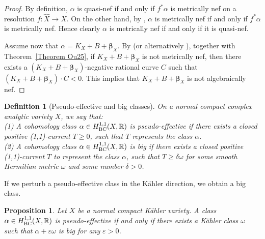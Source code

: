 \documentclass[12pt]{amsart}
\numberwithin{equation}{section}
\newtheorem{proposition}[theorem]{Proposition}
\theoremstyle{definition}
\theoremstyle{plain}
\newtheorem{definition}  [theorem]     {Definition}
\newtheorem*{thm A*}{Theorem A}
\newtheorem*{thm B*}{Theorem B}
\newtheorem*{thm C*}{Theorem C}
\newtheorem*{thm D*}{Theorem D}
\theoremstyle{definition}
\renewcommand{\1}{\mathds{1}}
\newcommand{\bbeta}{\boldsymbol{\beta}}
\renewcommand{\>}{\rightarrow}
\begin{document}
\begin{proof}
By definition, $\alpha$ is quasi-nef if and only if $f^* \alpha$ is metrically nef on a resolution $f: \widehat{X} \to X$. On the other hand, by \cite[Theorem 1]{Paunnef},  $\alpha$ is metrically nef if and only if $f^* \alpha$ is metrically nef. Hence clearly $\alpha$ is metrically nef if and only if it is quasi-nef. 

Assume now that $\alpha = K_X + B + \bbeta_X$. By \cite[Theorem 0.5]{HP24} (or alternatively \cite[Theorem 1.3]{CH20}), together with Theorem~\ref{Theorem Ou25}, if $K_X + B + \bbeta_X$ is not metrically nef, then there exists a $(K_X + B + \bbeta_X)$-negative rational curve $C$ such that $
(K_X + B + \bbeta_X)\cdot C < 0$. 
This implies that $K_X + B + \bbeta_X$ is not algebraically nef. 
\end{proof}

\begin{definition}[Pseudo-effective and big classes]
On a normal compact complex analytic variety $X$, we say that:\\  
\emph{(1)} A cohomology class $\alpha \in H^{1,1}_{\rm{BC}}(X,\mathbb{R})$ is \emph{pseudo-effective} if there exists a closed positive (1,1)-current $T\ge 0$, such that $T$ represents the class $\alpha$.\\
\emph{(2)} A cohomology class $\alpha \in H^{1,1}_{\rm{BC}}(X,\mathbb{R})$ is \emph{big} if there exists a closed positive (1,1)-current $T$ to represent the class $\alpha$,  such that $T\ge \delta \omega$ for some smooth Hermitian metric $\omega$ and some number $\delta >0$. 
\end{definition}

If we perturb a pseudo-effective class in the K\"ahler direction, we obtain a big class. 
\begin{proposition}\label{bigandpseff}
Let $X$ be a normal compact K\"ahler variety. A class $\alpha \in H^{1,1}_{\rm{BC}}(X,\mathbb{R})$ is pseudo-effective if and only if there exists a K\"ahler class $\omega$ such that $\alpha + \varepsilon \omega$ is big for any $\varepsilon >0$. 
\end{proposition}
\end{document}
